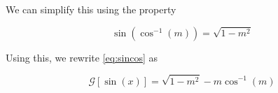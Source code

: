 \documentclass[12pt,a4paper]{article}
\begin{document}
\begin{enumerate}[(a)]
We can simplify this using the property

\begin{equation}
	\sin(\cos^{-1}(m)) = \sqrt{1 - m^2} \label{eq:cosproperty}
\end{equation}

Using this, we rewrite \eqref{eq:sincos} as

\begin{equation}\label{eq:answer-b2}
	\boxed{	
		\mathcal{G}[\sin(x)] = \sqrt{1-m^2} - m\cos^{-1}(m)
	}
\end{equation}

\end{enumerate}
\end{document}
